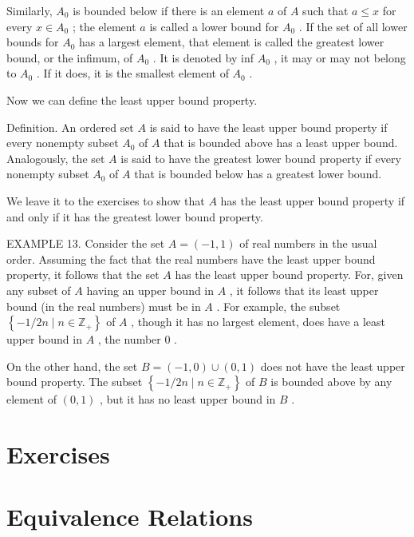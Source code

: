 \documentclass[10pt]{article}
\begin{document}
Similarly, \({A}_{0}\) is bounded below if there is an element \(a\) of \(A\) such that \(a \leq  x\) for every \(x \in  {A}_{0}\) ; the element \(a\) is called a lower bound for \({A}_{0}\) . If the set of all lower bounds for \({A}_{0}\) has a largest element, that element is called the greatest lower bound, or the infimum, of \({A}_{0}\) . It is denoted by inf \({A}_{0}\) , it may or may not belong to \({A}_{0}\) . If it does, it is the smallest element of \({A}_{0}\) .

Now we can define the least upper bound property.

Definition. An ordered set \(A\) is said to have the least upper bound property if every nonempty subset \({A}_{0}\) of \(A\) that is bounded above has a least upper bound. Analogously, the set \(A\) is said to have the greatest lower bound property if every nonempty subset \({A}_{0}\) of \(A\) that is bounded below has a greatest lower bound.

We leave it to the exercises to show that \(A\) has the least upper bound property if and only if it has the greatest lower bound property.

EXAMPLE 13. Consider the set \(A = \left( {-1,1}\right)\) of real numbers in the usual order. Assuming the fact that the real numbers have the least upper bound property, it follows that the set \(A\) has the least upper bound property. For, given any subset of \(A\) having an upper bound in \(A\) , it follows that its least upper bound (in the real numbers) must be in \(A\) . For example, the subset \(\left\{  {-1/{2n} \mid  n \in  {\mathbb{Z}}_{ + }}\right\}\) of \(A\) , though it has no largest element, does have a least upper bound in \(A\) , the number 0 .

On the other hand, the set \(B = \left( {-1,0}\right)  \cup  \left( {0,1}\right)\) does not have the least upper bound property. The subset \(\left\{  {-1/{2n} \mid  n \in  {\mathbb{Z}}_{ + }}\right\}\) of \(B\) is bounded above by any element of \(\left( {0,1}\right)\) , but it has no least upper bound in \(B\) .

\section*{Exercises}

\section*{Equivalence Relations}
\end{document}
